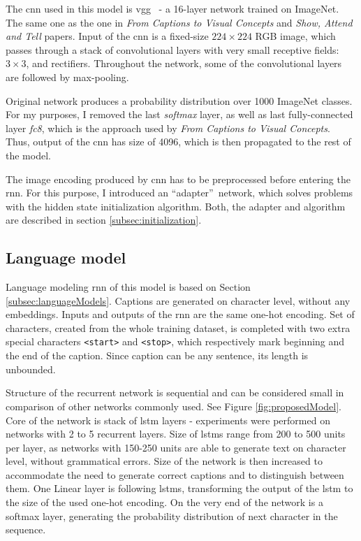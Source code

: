 The \gls{cnn} used in this model is \gls{vgg}~\cite{DBLP:journals/corr/SimonyanZ14a} - a 16-layer network trained on ImageNet. The same one as the one in \emph{From Captions to Visual Concepts} and \emph{Show, Attend and Tell} papers. Input of the \gls{cnn} is a fixed-size $ 224 \times 224 $ RGB image, which passes through a stack of convolutional layers with very small receptive fields: $ 3 \times 3 $, and rectifiers. Throughout the network, some of the convolutional layers are followed by max-pooling. 

Original network produces a probability distribution over 1000 ImageNet classes. For my purposes, I removed the last \emph{softmax} layer, as well as last fully-connected layer \emph{fc8}, which is the approach used by \emph{From Captions to Visual Concepts}. Thus, output of the \gls{cnn} has size of 4096, which is then propagated to the rest of the model.

The image encoding produced by \gls{cnn} has to be preprocessed before entering the \gls{rnn}. For this purpose, I introduced an \textquotedblleft adapter\textquotedblright\ network, which solves problems with the hidden state initialization algorithm. Both, the adapter and algorithm are described in section \ref{subsec:initialization}.

\subsection{Language model} \label{subsec:designLangMod}

Language modeling \gls{rnn} of this model is based on Section \ref{subsec:languageModels}. Captions are generated on character level, without any embeddings. Inputs and outputs of the \gls{rnn} are the same one-hot encoding. Set of characters, created from the whole training dataset, is completed with two extra special characters \texttt{<start>} and \texttt{<stop>}, which respectively mark beginning and the end of the caption. Since caption can be any sentence, its length is unbounded.

Structure of the recurrent network is sequential and can be considered small in comparison of other networks commonly used. See Figure \ref{fig:proposedModel}. Core of the network is stack of \gls{lstm} layers - experiments were performed on networks with 2 to 5 recurrent layers. Size of \gls{lstm}s range from 200 to 500 units per layer, as networks with 150-250 units are able to generate text on character level, without grammatical errors. Size of the network is then increased to accommodate the need to generate correct captions and to distinguish between them. One Linear layer is following \gls{lstm}s, transforming the output of the \gls{lstm} to the size of the used one-hot encoding. On the very end of the network is a softmax layer, generating the probability distribution of next character in the sequence.

